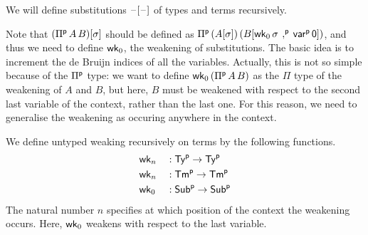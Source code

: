 
We will define substitutions $\mathord{\hspace{1pt}\text{--}\hspace{1pt}}[\mathord{\hspace{1pt}\text{--}\hspace{1pt}}]$ of types and terms
recursively.

Note that $({\Pi}^{\mathsf{p}} \,A\,B)[\sigma]$ should be defined as
${\Pi}^{\mathsf{p}} \,(A[\sigma])\,(B[\mathsf{wk}_0\,\sigma \,\mathbin{{,}^{\mathsf{p}}}\, {\mathsf{var}}^{\mathsf{p}}\,\mathsf{0}])$,
and thus we need to define $\mathsf{wk}_0$, the weakening of substitutions.
The basic idea is to increment the de Bruijn indices of all the
variables.  Actually, this is not so simple because of the ${\Pi}^{\mathsf{p}}$
type: we want to define $\mathsf{wk}_0\,({\Pi}^{\mathsf{p}}\,A\,B)$ as the $\Pi$ type of the
weakening of $A$ and $B$, but here, $B$ must be weakened with respect
to the second last variable of the context, rather than the last one.
For this reason, we need to generalise the weakening as occuring
anywhere in the context.

\begin{definition}
  We define untyped weaking recursively on terms by the following
  functions.
  \begin{alignat*}{5}
    & \mathsf{wk}_n && :  {\mathsf{Ty}}^{\mathsf{p}}\rightarrow{\mathsf{Ty}}^{\mathsf{p}} \\
    & \mathsf{wk}_n && :  {\mathsf{Tm}}^{\mathsf{p}}\rightarrow{\mathsf{Tm}}^{\mathsf{p}} \\
    & \mathsf{wk}_0 && : {\mathsf{Sub}}^{\mathsf{p}}\rightarrow {\mathsf{Sub}}^{\mathsf{p}}
  \end{alignat*}
  The natural number $n$ specifies at which position of the context the
  weakening occurs.
  Here, $\mathsf{wk}_0$ weakens with respect to the last variable.
\end{definition}

